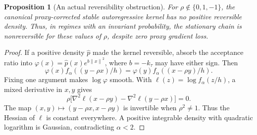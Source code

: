 \documentclass[pdflatex,iicol,sn-mathphys-ay]{sn-jnl}
\newtheorem{proposition}[theorem]{Proposition}
\theoremstyle{definition}\newtheorem{definition}[theorem]{Definition}
\theoremstyle{remark}\newtheorem{remark}[theorem]{Remark}
\numberwithin{equation}{section}
\newcommand{\norm}[1]{\left\lVert#1\right\rVert}\newcommand{\TV}{\mathrm{TV}}
\newcommand{\1}{\mathbf 1}
\begin{document}
\begin{proposition}[An actual reversibility obstruction]\label{prop:irreversible}
For $\rho\notin\{0,1,-1\}$, the canonical proxy-corrected stable autoregressive kernel has no positive reversible density. Thus, in regimes with an invariant probability, the stationary chain is nonreversible for these values of $\rho$, despite zero proxy gradient loss.
\end{proposition}
\begin{proof}
If a positive density $\widehat p$ made the kernel reversible, absorb the acceptance ratio into $\varphi(x)=\widehat p(x)e^{b\norm x^2}$, where $b=-k_\tau$ may have either sign. Then
\[
\varphi(x)f_\alpha((y-\rho x)/h)=\varphi(y)f_\alpha((x-\rho y)/h).
\]
Fixing one argument makes $\log\varphi$ smooth. With $\ell(z)=\log f_\alpha(z/h)$, a mixed derivative in $x,y$ gives
\[
\rho\bigl[\nabla^2\ell(x-\rho y)-\nabla^2\ell(y-\rho x)\bigr]=0.
\]
The map $(x,y)\mapsto(y-\rho x,x-\rho y)$ is invertible when $\rho^2\ne1$. Thus the Hessian of $\ell$ is constant everywhere. A positive integrable density with quadratic logarithm is Gaussian, contradicting $\alpha<2$.
\end{proof}
\end{document}
